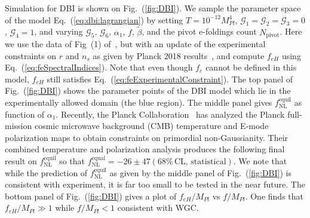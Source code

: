 \documentclass[12pt]{article}
\begin{document}
Simulation for DBI is shown on Fig.~(\ref{fig:DBI}).
We sample the parameter space of the model Eq.~(\ref{eq:dbi:lagrangian}) by setting $T = 10^{-12} M_{Pl}^4$, $\mathcal{G}_1 = \mathcal{G}_2 = \mathcal{G}_3 = 0$, $\mathcal{G}_4 = 1$, and varying $\mathcal{G}_5$, $\mathcal{G}_6$, $\alpha_1$, $f$, $\tilde\beta$, and the pivot e-foldings count $N_\text{pivot}$.
Here we use the data of Fig~(1) of~\cite{Nath:2018xxe}, but with an update of the experimental constraints on $r$ and $n_s$ as given by Planck 2018 results~\cite{Akrami:2018odb}, and compute $f_{eH}$ using Eq.~(\ref{eq:feSpectralIndices}).
Note that even though $f_e$ cannot be defined in this model, $f_{eH}$ still satisfies Eq.~(\ref{eq:feExperimentalConstraint}).
The top panel of Fig.~(\ref{fig:DBI}) shows the parameter points of the DBI model which lie in the experimentally allowed domain (the blue region).
The middle panel gives $f^{\text{equil}}_{\text{NL}}$ as function of $\alpha_1$.
Recently, the Planck Collaboration~\cite{Akrami:2019izv} has analyzed the Planck full-mission cosmic microwave background (CMB) temperature and E-mode polarization maps to obtain constraints on primordial non-Gaussianity.
Their combined temperature and polarization analysis produces the following final result on $f^{\text{equil}}_{\text{NL}}$ so that $f^{\text{equal}}_{\text{NL}} = -26 \pm 47 \left(68\%\, \text{CL, statistical}\right)$.
We note that while the prediction of $f^{\text{equil}}_{\text{NL}}$ as given by the middle panel of Fig.~(\ref{fig:DBI}) is consistent with experiment, it is far too small to be tested in the near future.
The bottom panel of Fig.~(\ref{fig:DBI}) gives a plot of $f_{eH} / M_{Pl}$ vs $f / M_{Pl}$.
One finds that $f_{eH} / M_{Pl} \gg 1$ while $f / M_{Pl} < 1$ consistent with WGC.
\end{document}
